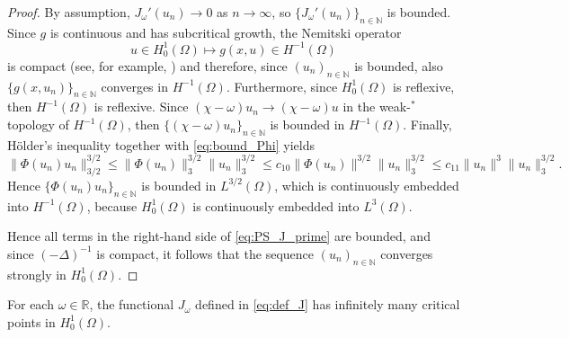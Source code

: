 \documentclass[reqno]{amsart}
\begin{document}
\begin{proof}
By assumption, $J_\omega'(u_n) \to 0$ as $n \to \infty$, so 
$\{J_\omega'(u_n)\}_{n \in \mathbb N}$ is bounded. Since $g$ is continuous and has 
subcritical growth, the Nemitski operator
\[
 u \in H_0^1(\Omega) \mapsto g(x, u) \in H^{-1}(\Omega)
\]
is compact (see, for example, \cite{AmbrosettiMalchiodi2007, AmbrosettiProdi1993}) and 
therefore, since $(u_n)_{n \in \mathbb N}$ is bounded, also 
$\{g(x, u_n)\}_{n \in \mathbb N}$ converges in $H^{-1}(\Omega)$. Furthermore, 
since $H_0^1(\Omega)$ is reflexive, then $H^{-1}(\Omega)$ is reflexive. 
Since $(\chi - \omega) u_n \to (\chi - \omega) u$ in the weak-$^*$ topology of 
$H^{-1}(\Omega)$, then $\{(\chi - \omega)u_n\}_{n \in \mathbb N}$ is bounded in 
$H^{-1}(\Omega)$. Finally, H\"older's inequality together with \eqref{eq:bound_Phi} 
yields
\begin{equation}
 \|\Phi(u_n) u_n\|_{3/2}^{3/2}
  \leq \|\Phi(u_n)\|_3^{3/2} \|u_n\|_3^{3/2}
  \leq c_{10} \|\Phi(u_n)\|^{3/2} \|u_n\|_3^{3/2}
  \leq c_{11} \|u_n\|^3 \|u_n\|_3^{3/2}.
\end{equation}
Hence $\{\Phi(u_n)u_n\}_{n \in \mathbb N}$ is bounded in $L^{3/2}(\Omega)$,
which is continuously embedded into $H^{-1}(\Omega)$, because $H_0^1(\Omega)$ is
continuously embedded into $L^3(\Omega)$.

Hence all terms in the right-hand side of \eqref{eq:PS_J_prime} are bounded, and 
since $(- \Delta)^{-1}$ is compact, it follows that the sequence 
$(u_n)_{n \in \mathbb N}$ converges strongly in $H_0^1(\Omega)$.
\end{proof}

\begin{proposition}
 \label{prop:Critical_points_J_Dirichlet}
For each $\omega \in \mathbb R$, the functional $J_\omega$ defined in \eqref{eq:def_J} 
has infinitely many critical points in $H_0^1(\Omega)$.
\end{proposition}
\end{document}

